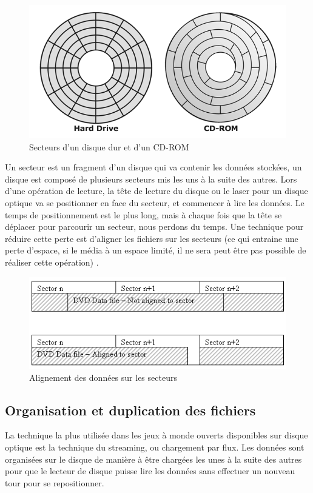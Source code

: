 \documentclass[a4paper, 11pt]{article} %
\begin{document}
\begin{figure}[!h]%
\begin{center} 
\includegraphics[width=0.60\columnwidth]{images/disk_sector.png}%
\caption{Secteurs d'un disque dur et d'un CD-ROM}%
\label{}%
\end{center}
\end{figure}

Un secteur est un fragment d'un disque qui va contenir les données stockées, un disque est composé de plusieurs secteurs mis les uns à la suite des autres. Lors d'une opération de lecture, la tête de lecture du disque ou le laser pour un disque optique va se positionner en face du secteur, et commencer à lire les données. Le temps de positionnement est le plus long, mais à chaque fois que la tête se déplacer pour parcourir un secteur, nous perdons du temps. 
Une technique pour réduire cette perte est d'aligner les fichiers sur les secteurs (ce qui entraine une perte d'espace, si le média à un espace limité, il ne sera peut être pas possible de réaliser cette opération) \cite{industry:streaming-for-loading}.

\begin{figure}[!h]%
\begin{center} 
\includegraphics[width=0.60\columnwidth]{images/sector_storage.png}%
\caption{Alignement des données sur les secteurs}%
\label{}%
\end{center}
\end{figure}

\newpage
\subsection*{Organisation et duplication des fichiers}
La technique la plus utilisée dans les jeux à monde ouverts disponibles sur disque optique est la technique du streaming, ou chargement par flux. Les données sont organisées sur le disque de manière à être chargées les unes à la suite des autres pour que le lecteur de disque puisse lire les données sans effectuer un nouveau tour pour se repositionner.
\end{document}
